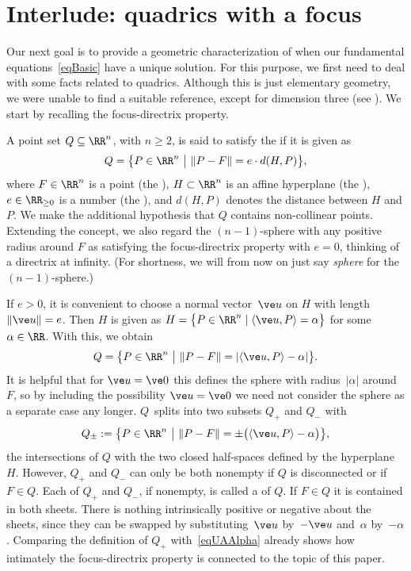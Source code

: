 \documentclass[reqno]{amsart}
\begin{document}
\section{Interlude: quadrics with a focus} \label{sQuadric}%

Our next goal is to provide a geometric characterization of
when our fundamental equations~\eqref{eqBasic} have a unique solution. For this purpose, we first need to deal with some facts related to quadrics. Although this is just elementary
geometry, we were unable to find a suitable reference, except for dimension three (see ). We start by recalling the focus-directrix property.

A point set $Q \subseteq \RR^n$, with $n \ge 2$, is said to satisfy
the  if it is given as
\begin{equation} \label{eqQ0}%
  Q = \bigl\{ P \in \RR^n \ \bigr| \ \lVert P - F\rVert = e \cdot
  d(H,P)\bigr\},
\end{equation}
where $F \in \RR^n$ is a point (the ),
$H \subset \RR^n$ is an affine hyperplane (the ),
$e \in \RR_{\ge 0}$ is a number (the ), and
$d(H,P)$ denotes the distance between $H$ and $P$. We make the
additional hypothesis that $Q$ contains non-collinear
points. Extending the concept, we also regard the $(n-1)$-sphere with
any positive radius around $F$ as satisfying the focus-directrix
property with $e = 0$, thinking of a directrix at infinity. (For
shortness, we will from now on just say {\em sphere} for the
$(n-1)$-sphere.)  

If $e > 0$, it is convenient to choose a normal vector~$\ve u$ on $H$
with length $\lVert\ve u\rVert = e$. Then $H$ is given as
$H = \bigl\{ P \in \RR^n \mid \langle\ve u,P\rangle = \alpha\bigr\}$
for some $\alpha \in \RR$. With this, we obtain
\begin{equation} \label{eqQ1}%
  Q = \bigl\{ P \in \RR^n \ \bigr| \ \lVert P - F\rVert = |\langle\ve
  u,P\rangle - \alpha|\bigr\}.
\end{equation}
It is helpful that for $\ve u = \ve 0$ this defines the sphere with
radius~$|\alpha|$ around~$F$, so by including the possibility
$\ve u = \ve 0$ we need not consider the sphere as a separate case any
longer. $Q$~splits into two subsets $Q_+$ and $Q_-$ with
\begin{equation} \label{eqPlusMinus}%
  Q_\pm := \bigl\{ P \in \RR^n \ \bigr| \ \lVert P - F\rVert =
  \pm\bigl(\langle\ve u,P\rangle - \alpha\bigr)\bigr\},
\end{equation}
the intersections of $Q$ with the two closed half-spaces defined by
the hyperplane $H$. However, $Q_+$ and $Q_-$ can only be both nonempty
if $Q$ is disconnected or if $F \in Q$. Each of $Q_+$ and $Q_-$, if
nonempty, is called a  of $Q$. If $F \in Q$ it is contained
in both sheets. There is nothing intrinsically positive or negative
about the sheets, since they can be swapped by substituting~$\ve u$
by~$-\ve u$ and~$\alpha$ by~$-\alpha$. Comparing the definition of
$Q_+$ with~\eqref{eqUAAlpha} already shows how intimately the
focus-directrix property is connected to the topic of this paper.
\end{document}
